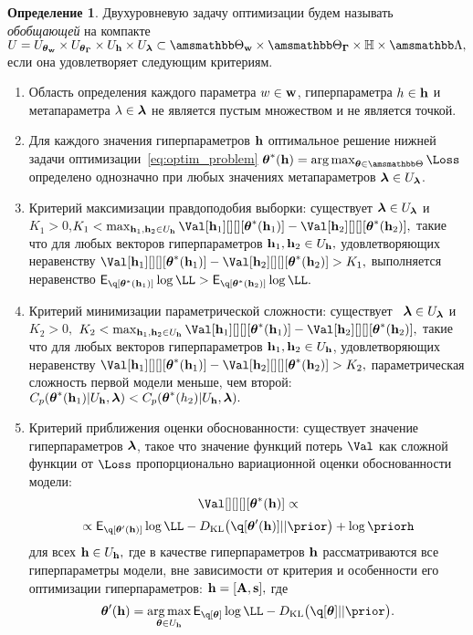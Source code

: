 \documentclass[11pt, a5paper]{dissert}
\theoremstyle{definition}
\newtheorem{defin}{Определение}
\DeclareMathOperator*{\argmax}{arg\,max}
\begin{document}
{\begin{enumerate}
\end{enumerate}

\begin{defin}
Двухуровневую задачу оптимизации будем называть \textit{обобщающей} на компакте $U = \Utetaw \times \UtetaG \times \Uh \times \Ulam \subset \Tetawb \times \TetaGb \times \Hb \times \Lamb,$ если она удовлетворяет следующим критериям.
\begin{enumerate}
\item Область определения каждого параметра $w \in \mathbf{w}$, гиперпараметра $h \in \mathbf{h}$ и метапараметра $\lambda \in \boldsymbol{\lambda}$ не  является пустым множеством и не является точкой.
\item Для каждого значения гиперпараметров $\mathbf{h}$ оптимальное решение нижней задачи оптимизации~\eqref{eq:optim_problem} 
$
\teta^{*}(\h) = \argmax_{\teta \in \Tetab} \Loss
$
определено однозначно при любых значениях метапараметров $\boldsymbol{\lambda} \in U_{\boldsymbol{\lambda}}$.

\item Критерий максимизации правдоподобия выборки: существует $\boldsymbol{\lambda} \in U_{\boldsymbol{\lambda}}$ и  $K_1>0$,$K_1 < \max_{\h_1,\h_2 \in \Uh} \Val[\h_1][][][\teta^{*}(\h_1)] - \Val[\h_2][][][\teta^{*}(\h_2)],$ такие что для любых векторов гиперпараметров $\mathbf{h}_1, \mathbf{h}_2 \in U_{\mathbf{h}},$ удовлетворяющих неравенству $\Val[\h_1][][][\teta^{*}(\h_1)] - \Val[\h_2][][][\teta^{*}(\h_2)] > K_1,$ выполняется неравенство $\E_{\q[\teta^{*}(\h_1)]}\log\LL > \E_{\q[\teta^{*}(\h_2)]}\log\LL.$

\item Критерий минимизации параметрической сложности:  существует  $\boldsymbol{\lambda} \in U_{\boldsymbol{\lambda}}$ и $K_2>0,$ $K_2 < \max_{\h_1, \h_2 \in \Uh} \Val[\h_1][][][\teta^{*}(\h_1)] - \Val[\h_2][][][\teta^{*}(\h_2)],$ такие что для любых векторов гиперпараметров $\mathbf{h}_1,\mathbf{h}_2 \in U_{\mathbf{h}}$, удовлетворяющих неравенству $\Val[\h_1][][][\teta^{*}(\h_1)] - \Val[\h_2][][][\teta^{*}(\h_2)]>K_2,$ параметрическая сложность первой модели меньше, чем второй: $C_p(\boldsymbol{\theta}^{*}(\mathbf{h}_1)|U_{\mathbf{h}},\boldsymbol{\lambda})<C_p(\boldsymbol{\theta}^{*}(h_2)|U_{\mathbf{h}},\boldsymbol{\lambda}).$

\item Критерий приближения оценки обоснованности: существует значение гиперпараметров $\boldsymbol{\lambda}$, такое что значение функций потерь $\Val$ как сложной функции от $\Loss$ пропорционально вариационной оценки обоснованности модели: $$\Val[][][][\teta^{*}(\h)] \propto $$
$$\propto
\E_{\q[\teta'(\h)]}\log\LL - \KL{\q[\teta'(\h)]}{\prior} + \log\priorh$$ для всех $\mathbf{h} \in U_{\mathbf{h}},$
где в качестве гиперпараметров $\mathbf{h}$ рассматриваются все гиперпараметры модели, вне зависимости от критерия и особенности его оптимизации гиперпараметров: $\mathbf{h} = [\mathbf{A}, \mathbf{s}],$
где $$\teta'(\h) = \argmax_{\teta \in \Uh} \E_{\q[\teta]}\log\LL - \KL{\q[\teta]}{\prior}.$$


\end{enumerate}
\end{defin}}
\end{document}
